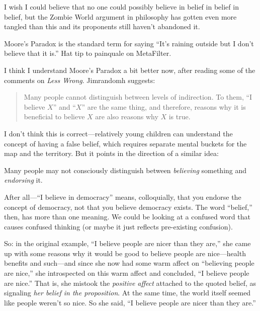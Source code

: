 {
 I wish I could believe that no one could possibly believe in
belief in belief in belief, but the Zombie World argument in philosophy
has gotten even more tangled than this and its proponents still
haven't abandoned it.}

\myendsectiontext


\bigskip


{
 Moore's Paradox is the standard term for saying
``It's raining outside but I
don't believe that it is.'' Hat tip
to painquale on MetaFilter. }

{
 I think I understand Moore's Paradox a bit better
now, after reading some of the comments on \textit{Less Wrong}.
Jimrandomh suggests:}

\begin{quote}
{
 Many people cannot distinguish between levels of indirection. To
them, ``I believe $X$'' and
``$X$'' are the same thing, and
therefore, reasons why it is beneficial to believe $X$ are also reasons
why $X$ is true.}
\end{quote}

{
 I don't think this is correct---relatively young
children can understand the concept of having a false belief, which
requires separate mental buckets for the map and the territory. But it
points in the direction of a similar idea:}

{
 Many people may not consciously distinguish between
\textit{believing} something and \textit{endorsing} it.}

{
 After all---``I believe in
democracy'' means, colloquially, that you endorse the
concept of democracy, not that you believe democracy exists. The word
``belief,'' then, has more than one
meaning. We could be looking at a confused word that causes confused
thinking (or maybe it just reflects pre-existing confusion).}

{
 So: in the original example, ``I believe people
are nicer than they are,'' she came up with some
reasons why it would be good to believe people are nice---health
benefits and such---and since she now had some warm affect on
``believing people are nice,'' she
introspected on this warm affect and concluded, ``I
believe people are nice.'' That is, she mistook the
\textit{positive affect} attached to the quoted belief, as signaling
\textit{her belief in the proposition}. At the same time, the world
itself seemed like people weren't so nice. So she said,
``I believe people are nicer than they
are.''}

